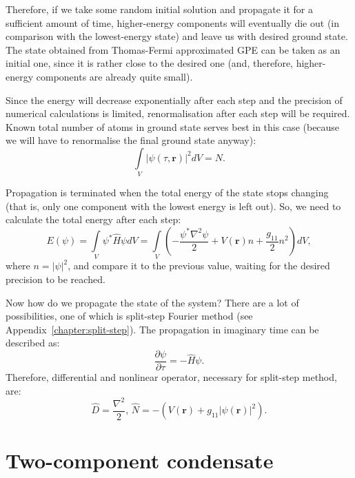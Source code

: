 \documentclass[12pt,notitlepage]{report}
\begin{document}
Therefore, if we take some random initial solution and propagate it for a sufficient amount of time,
higher-energy components will eventually die out (in comparison with the lowest-energy state)
and leave us with desired ground state.
The state obtained from Thomas-Fermi approximated GPE can be taken as an initial one,
since it is rather close to the desired one (and, therefore, higher-energy components are already quite small).

Since the energy will decrease exponentially after each step and the precision of numerical calculations is limited,
renormalisation after each step will be required.
Known total number of atoms in ground state serves best in this case
(because we will have to renormalise the final ground state anyway):
\[ \int\limits_V \lvert \psi(\tau, \mathbf{r}) \rvert^2 dV = N. \]

Propagation is terminated when the total energy of the state stops changing
(that is, only one component with the lowest energy is left out).
So, we need to calculate the total energy after each step:
\[
E(\psi) = \int\limits_V \psi^* \hat{H} \psi dV =
\int\limits_V \left(
-\frac{\psi^* \nabla^2 \psi}{2} + V(\mathbf{r}) n + \frac{g_{11}}{2} n^2
\right) dV,
\]
where $n = \lvert \psi \rvert^2$,
and compare it to the previous value, waiting for the desired precision to be reached.

Now how do we propagate the state of the system?
There are a lot of possibilities, one of which is split-step Fourier method (see Appendix~\ref{chapter:split-step}).
The propagation in imaginary time can be described as:
\[ \frac{\partial \psi}{\partial \tau} = - \hat{H} \psi. \]
Therefore, differential and nonlinear operator, necessary for split-step method, are:
\[
\hat{D} = \frac{\nabla^2}{2},\,
\hat{N} = -\left( V(\mathbf{r}) + g_{11} \lvert \psi(\mathbf{r}) \rvert^2 \right).
\]

\section{Two-component condensate}
\end{document}
